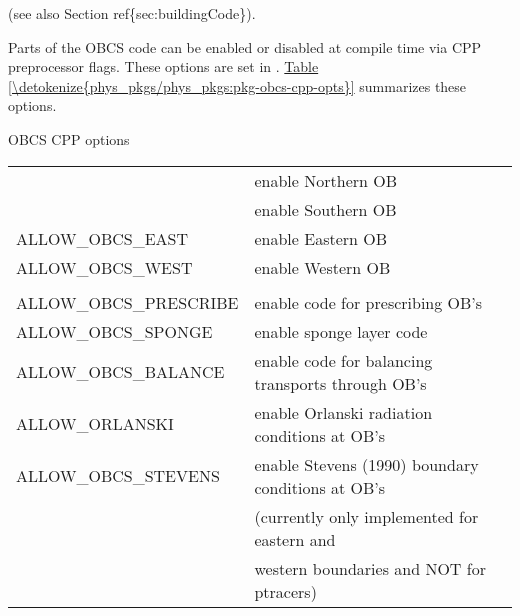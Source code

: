 \documentclass[letterpaper,10pt,english]{sphinxmanual}
\begin{document}
(see also Section ref\{sec:buildingCode\}).

Parts of the OBCS code can be enabled or disabled at compile time
via CPP preprocessor flags. These options are set in
. \hyperref[\detokenize{phys_pkgs/phys_pkgs:pkg-obcs-cpp-opts}]{Table \ref{\detokenize{phys_pkgs/phys_pkgs:pkg-obcs-cpp-opts}}} summarizes these options.


\begin{threeparttable}
\capstart\caption{OBCS CPP options}\label{\detokenize{phys_pkgs/phys_pkgs:pkg-obcs-cpp-opts}}\label{\detokenize{phys_pkgs/phys_pkgs:id13}}
\noindent\begin{tabulary}{\linewidth}{|l|l|}
\hline

&
\\
\hline
{}
&
enable Northern OB
\\
\hline
{}
&
enable Southern OB
\\
\hline
ALLOW\_OBCS\_EAST
&
enable Eastern OB
\\
\hline
ALLOW\_OBCS\_WEST
&
enable Western OB
\\
\hline&\\
\hline
ALLOW\_OBCS\_PRESCRIBE
&
enable code for prescribing OB's
\\
\hline
ALLOW\_OBCS\_SPONGE
&
enable sponge layer code
\\
\hline
ALLOW\_OBCS\_BALANCE
&
enable code for balancing transports through OB's
\\
\hline
ALLOW\_ORLANSKI
&
enable Orlanski radiation conditions at OB's
\\
\hline
ALLOW\_OBCS\_STEVENS
&
enable Stevens (1990) boundary conditions at OB's
\\
\hline&
(currently only implemented for eastern and
\\
\hline&
western boundaries and NOT for ptracers)
\\
\hline\end{tabulary}

\end{threeparttable}
\end{document}
